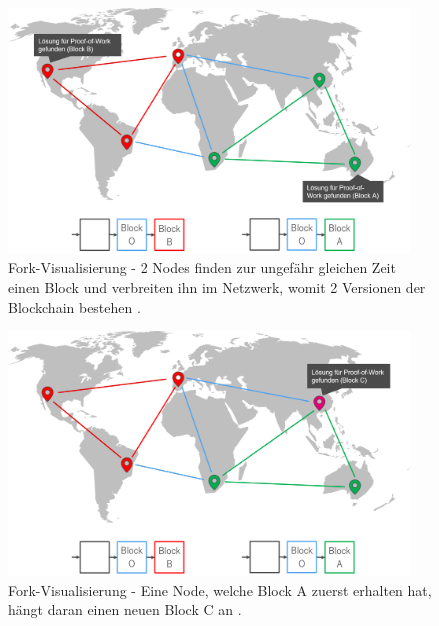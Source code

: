 \begin{figure}[htb]
  \centering
	\includegraphics[width=0.95\textwidth,angle=0]{images/fork_2}
 	\caption{Fork-Visualisierung - 2 Nodes finden zur ungefähr gleichen Zeit einen Block und verbreiten ihn im Netzwerk, womit 2 Versionen der Blockchain bestehen \cite{AntonopoulosMasteringbitcoin2015}.}
	\label{fig:fork_2}
\end{figure}

\begin{figure}[htb]
  \centering
	\includegraphics[width=0.95\textwidth,angle=0]{images/fork_3}
 	\caption{Fork-Visualisierung - Eine Node, welche Block A zuerst erhalten hat, hängt daran einen neuen Block C an \cite{AntonopoulosMasteringbitcoin2015}.}
	\label{fig:fork_3}
\end{figure}

